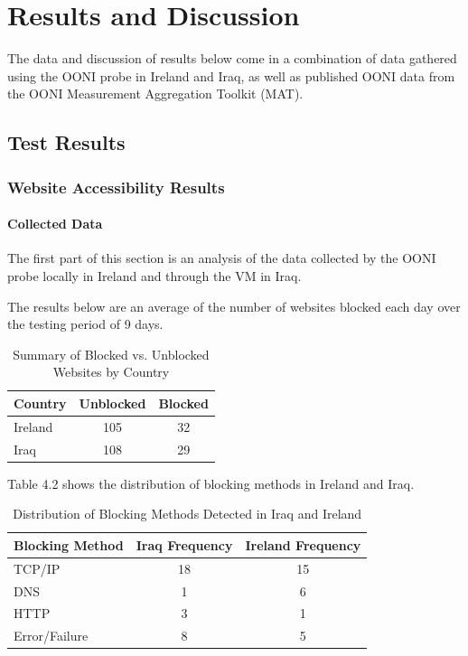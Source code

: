\chapter{Results and Discussion}

The data and discussion of results below come in a combination of data gathered using the OONI probe in Ireland and Iraq, as well as published OONI data from the OONI Measurement Aggregation Toolkit (MAT).

\section{Test Results}

\subsection{Website Accessibility Results}

\subsubsection{Collected Data}

The first part of this section is an analysis of the data collected by the OONI probe locally in Ireland and through the VM in Iraq.

The results below are an average of the number of websites blocked each day over the testing period of 9 days.

\vspace{2em}

\begin{table}[H]
\centering
\caption{Summary of Blocked vs. Unblocked Websites by Country}
\begin{tabular}{lcc}
\toprule
\textbf{Country} & \textbf{Unblocked} & \textbf{Blocked} \\
\midrule
Ireland & 105 & 32 \\
Iraq    & 108 & 29 \\   
\bottomrule
\end{tabular}
\label{tab:blocked_summary}
\end{table}

Table 4.2 shows the distribution of blocking methods in Ireland and Iraq.

\vspace{2em}

\begin{table}[H]
\centering
\caption{Distribution of Blocking Methods Detected in Iraq and Ireland}
\begin{tabular}{lcc}
\toprule
\textbf{Blocking Method} & \textbf{Iraq Frequency} & \textbf{Ireland Frequency} \\
\midrule
TCP/IP         & 18 & 15 \\
DNS            & 1  & 6  \\
HTTP           & 3  & 1  \\
Error/Failure  & 8  & 5  \\
\bottomrule
\end{tabular}
\label{tab:blocking_methods_comparison}
\end{table}

